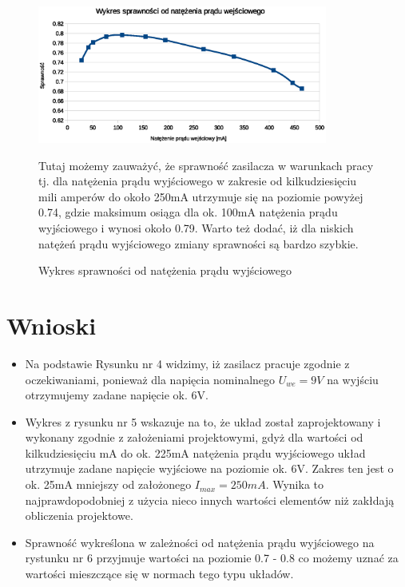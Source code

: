 \documentclass[a4paper,12pt]{article}
\begin{document}
\begin{figure}[h!]
  \begin{center}
  \includegraphics[width=0.85\textwidth]{spr_Iwy.eps}
  \caption{Wykres sprawności od natężenia prądu wyjściowego}
  \end{center}
  
  Tutaj możemy zauważyć, że sprawność zasilacza w warunkach pracy tj. dla natężenia prądu wyjściowego w zakresie od
kilkudziesięciu mili amperów do około 250mA utrzymuje się na poziomie powyżej 0.74, gdzie maksimum osiąga 
dla ok. 100mA natężenia prądu wyjściowego i wynosi około 0.79.
Warto też dodać, iż dla niskich natężeń prądu wyjściowego zmiany sprawności są bardzo szybkie.
\end{figure}



\section {Wnioski}

\begin{itemize}
  \item Na podstawie Rysunku nr 4 widzimy, iż zasilacz pracuje zgodnie z oczekiwaniami, ponieważ dla 
	napięcia nominalnego $U_{we} = 9V$ na wyjściu otrzymujemy zadane napięcie ok. 6V.
  \item Wykres z rysunku nr 5 wskazuje na to, że układ został zaprojektowany i wykonany zgodnie z założeniami
	projektowymi, gdyż dla wartości od kilkudziesięciu mA do ok. 225mA natężenia prądu wyjściowego 
	układ utrzymuje zadane napięcie wyjściowe na poziomie ok. 6V. Zakres ten jest o ok. 25mA mniejszy
	od założonego $I_{max} = 250mA$. Wynika to najprawdopodobniej z użycia nieco innych wartości
	elementów niż zakłdają obliczenia projektowe.
  \item Sprawność wykreślona w zależności od natężenia prądu wyjściowego na rystunku nr 6 przyjmuje 
	wartości na poziomie 0.7 - 0.8 co możemy uznać za wartości mieszczące się w normach tego typu układów.
\end{itemize}
\end{document}
